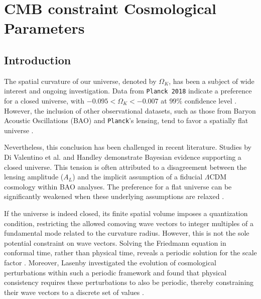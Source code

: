 \chapter{CMB constraint Cosmological Parameters}\label{chapter:Observation}



\section{Introduction}

The spatial curvature of our universe, denoted by $\Omega_K$, has been a subject of wide interest and ongoing investigation. Data from \texttt{Planck 2018} indicate a preference for a closed universe, with $-0.095 < \Omega_K < -0.007$ at $99\%$ confidence level  \cite{2020A&A...641A...6P}. However, the inclusion of other observational datasets, such as those from Baryon Acoustic Oscillations (BAO) and \texttt{Planck}'s lensing, tend to favor a spatially flat universe \cite{2020A&A...641A...6P, PhysRevD.105.063524}.

Nevertheless, this conclusion has been challenged in recent literature. Studies by Di Valentino et al. \cite{2020NatAs...4..196D} and Handley \cite{2021PhRvD.103d1301H} demonstrate Bayesian evidence supporting a closed universe. This tension is often attributed to a disagreement between the lensing amplitude ($A_L$) and the implicit assumption of a fiducial $\Lambda$CDM cosmology within BAO analyses. The preference for a flat universe can be significantly weakened when these underlying assumptions are relaxed \cite{2022MNRAS.517.3087G}.

If the universe is indeed closed, its finite spatial volume imposes a quantization condition, restricting the allowed comoving wave vectors to integer multiples of a fundamental mode related to the curvature radius. %
However, this is not the sole potential constraint on wave vectors. Solving the Friedmann equation in conformal time, rather than physical time, reveals a periodic solution for the scale factor \cite{2021arXiv210906204B, 2024PhLB..84938442B}. Moreover, Lasenby investigated the evolution of cosmological perturbations within such a periodic framework and found that physical consistency requires these perturbations to also be periodic, thereby constraining their wave vectors to a discrete set of values \cite{2022PhRvD.105h3514L}.

